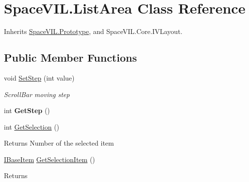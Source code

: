\hypertarget{class_space_v_i_l_1_1_list_area}{}\section{Space\+V\+I\+L.\+List\+Area Class Reference}
\label{class_space_v_i_l_1_1_list_area}


Inherits \mbox{\hyperlink{class_space_v_i_l_1_1_prototype}{Space\+V\+I\+L.\+Prototype}}, and Space\+V\+I\+L.\+Core.\+I\+V\+Layout.

\subsection*{Public Member Functions}
\begin{DoxyCompactItemize}
\item 
void \mbox{\hyperlink{class_space_v_i_l_1_1_list_area_a4092a62f4f548a9289632a91cd8d452a}{Set\+Step}} (int value)
\begin{DoxyCompactList}\small\item\em Scroll\+Bar moving step \end{DoxyCompactList}\item 
\mbox{\label{class_space_v_i_l_1_1_list_area_ad4b98361d3921da08ec168b2638c5031}} 
int {\bfseries Get\+Step} ()
\item 
\mbox{\label{class_space_v_i_l_1_1_list_area_a07991a67811d7341bde2968f4703f139}} 
int \mbox{\hyperlink{class_space_v_i_l_1_1_list_area_a07991a67811d7341bde2968f4703f139}{Get\+Selection}} ()
\begin{DoxyCompactList}\small\item\em \begin{DoxyReturn}{Returns}
Number of the selected item 
\end{DoxyReturn}
\end{DoxyCompactList}\item 
\mbox{\label{class_space_v_i_l_1_1_list_area_a365f9d965afdee8da578de16dc6f7e83}} 
\mbox{\hyperlink{interface_space_v_i_l_1_1_core_1_1_i_base_item}{I\+Base\+Item}} \mbox{\hyperlink{class_space_v_i_l_1_1_list_area_a365f9d965afdee8da578de16dc6f7e83}{Get\+Selection\+Item}} ()
\begin{DoxyCompactList}\small\item\em \begin{DoxyReturn}{Returns}

\end{DoxyReturn}
\end{DoxyCompactList}
\end{DoxyCompactItemize}
